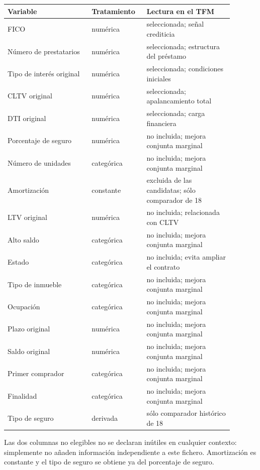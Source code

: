 \documentclass[10pt,a4paper]{article}
\begin{document}
\begin{center}\small
\begin{tabular}{p{0.34\linewidth} p{0.20\linewidth} p{0.35\linewidth}}
\textbf{Variable} & \textbf{Tratamiento} & \textbf{Lectura en el TFM}\\ \hline
FICO & numérica & seleccionada; señal crediticia\\
Número de prestatarios & numérica & seleccionada; estructura del préstamo\\
Tipo de interés original & numérica & seleccionada; condiciones iniciales\\
CLTV original & numérica & seleccionada; apalancamiento total\\
DTI original & numérica & seleccionada; carga financiera\\
Porcentaje de seguro & numérica & no incluida; mejora conjunta marginal\\
Número de unidades & categórica & no incluida; mejora conjunta marginal\\
Amortización & constante & excluida de las candidatas; sólo comparador de 18\\
LTV original & numérica & no incluida; relacionada con CLTV\\
Alto saldo & categórica & no incluida; mejora conjunta marginal\\
Estado & categórica & no incluida; evita ampliar el contrato\\
Tipo de inmueble & categórica & no incluida; mejora conjunta marginal\\
Ocupación & categórica & no incluida; mejora conjunta marginal\\
Plazo original & numérica & no incluida; mejora conjunta marginal\\
Saldo original & numérica & no incluida; mejora conjunta marginal\\
Primer comprador & categórica & no incluida; mejora conjunta marginal\\
Finalidad & categórica & no incluida; mejora conjunta marginal\\
Tipo de seguro & derivada & sólo comparador histórico de 18\\
\end{tabular}
\end{center}

Las dos columnas no elegibles no se declaran inútiles en cualquier contexto:
simplemente no añaden información independiente a este fichero. Amortización es
constante y el tipo de seguro se obtiene ya del porcentaje de seguro.
\end{document}
